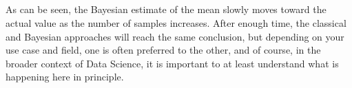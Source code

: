 \documentclass[11pt]{article}
\begin{document}
    \begin{center}
    \end{center}
    { \hspace*{\fill} \\}
    
    \begin{center}
    \end{center}
    { \hspace*{\fill} \\}
    
    \begin{center}
    \end{center}
    { \hspace*{\fill} \\}
    
    \begin{center}
    \end{center}
    { \hspace*{\fill} \\}
    
    As can be seen, the Bayesian estimate of the mean slowly moves toward
the actual value as the number of samples increases. After enough time,
the classical and Bayesian approaches will reach the same conclusion,
but depending on your use case and field, one is often preferred to the
other, and of course, in the broader context of Data Science, it is
important to at least understand what is happening here in principle.


    
    
    
    
\end{document}
